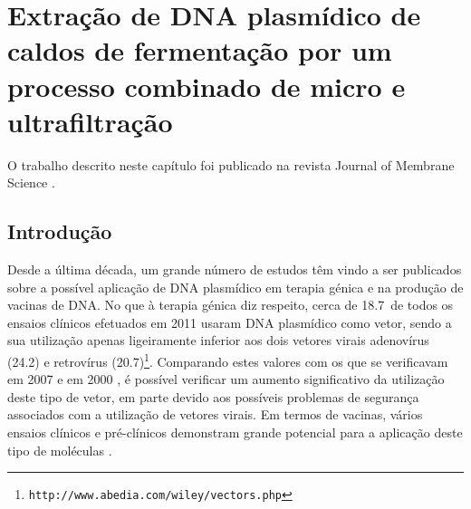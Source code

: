 \chapter{Extração de DNA plasmídico de caldos de fermentação por um processo combinado de micro e ultrafiltração}
\label{chap:art3}

O trabalho descrito neste capítulo foi publicado na revista Journal of Membrane Science \cite{meu3}.

\section{Introdução}
Desde a última década, um grande número de estudos têm vindo a ser publicados sobre a possível aplicação de DNA plasmídico em terapia génica e na produção de vacinas de DNA.
%
%
No que à terapia génica diz respeito, cerca de 18.7\porcento\ de todos os ensaios clínicos efetuados em 2011 usaram DNA plasmídico como vetor, sendo a sua utilização apenas ligeiramente inferior aos dois vetores virais adenovírus (24.2\porcento) e retrovírus (20.7\porcento)\footnote{\texttt{http://www.abedia.com/wiley/vectors.php}}.
%
Comparando estes valores com os que se verificavam em 2007 \cite{cai} e em 2000 \cite{mountain}, é possível verificar um aumento significativo da utilização deste tipo de vetor, em parte devido aos possíveis problemas de segurança associados com a utilização de vetores virais. Em termos de vacinas, vários ensaios clínicos e pré-clínicos demonstram grande potencial para a aplicação deste tipo de moléculas \cite{sousarev,liu03,liu11,kutzler}.
% 

